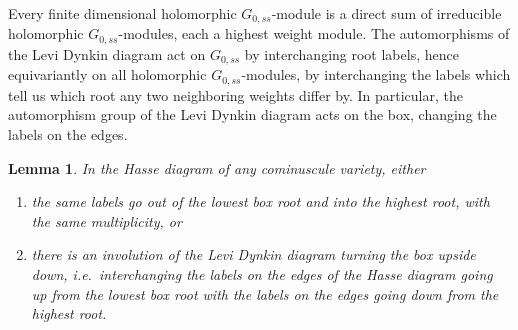 \documentclass[a4paper,10pt]{amsart}
\newtheorem{lemma}{Lemma}
\theoremstyle{remark}
\begin{document}
Every finite dimensional holomorphic \(G_{0,ss}\)-module is a direct sum of irreducible holomorphic \(G_{0,ss}\)-modules, each a highest weight module.
The automorphisms of the Levi Dynkin diagram act on \(G_{0,ss}\) by interchanging root labels, hence equivariantly on all holomorphic \(G_{0,ss}\)-modules, by interchanging the labels which tell us which root any two neighboring weights differ by.
In particular, the automorphism group of the Levi Dynkin diagram acts on the box, changing the labels on the edges.
\begin{lemma}
In the Hasse diagram of any cominuscule variety, either
\begin{enumerate}
\item 
the same labels go out of the lowest box root and into the highest root, with the same multiplicity, or
\item
there is an involution of the Levi Dynkin diagram turning the box upside down, i.e.~interchanging the labels on the edges of the Hasse diagram going up from the lowest box root with the labels on the edges going down from the highest root.
\end{enumerate}
\end{lemma}
\end{document}
